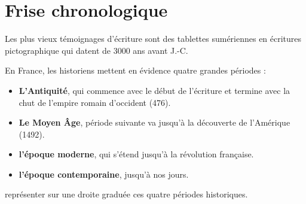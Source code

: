 \section{Frise chronologique}

Les plus vieux témoignages d'écriture sont des tablettes sumériennes en écritures pictographique qui datent de 3000 ans avant J.-C.

En France, les historiens mettent en évidence quatre grandes périodes :
\begin{itemize}
	\item \textbf{L'Antiquité}, qui commence avec le début de l'écriture et termine avec la chut de l'empire romain d'occident (476).
	
	\item \textbf{Le Moyen \^Age}, période suivante va jusqu'à la découverte de l'Amérique (1492).
	
	\item \textbf{l'époque moderne}, qui s'étend jusqu'à la révolution française.
	
	\item \textbf{l'époque contemporaine}, jusqu'à nos jours.
\end{itemize}

\begin{questions}
	\question représenter sur une droite graduée ces quatre périodes historiques. 
\end{questions}